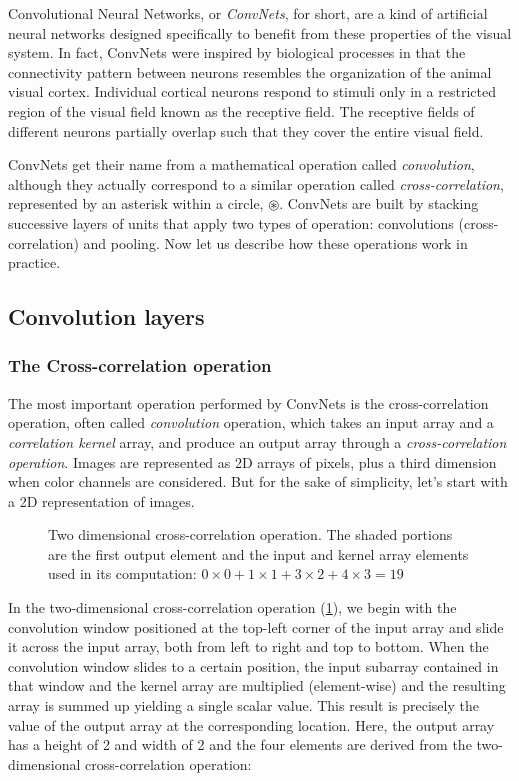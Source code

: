 Convolutional Neural Networks, or \textit{ConvNets}, for short, are a kind of artificial neural networks designed specifically to benefit from these properties of the visual system. In fact, ConvNets were inspired by biological processes in that the connectivity pattern between neurons resembles the organization of the animal visual cortex. Individual cortical neurons respond to stimuli only in a restricted region of the visual field known as the receptive field. The receptive fields of different neurons partially overlap such that they cover the entire visual field.

ConvNets get their name from a mathematical operation called \textit{convolution}, although they actually correspond to a similar operation called \textit{cross-correlation}, represented by an asterisk within a circle, $\circledast$. ConvNets are built by stacking successive layers of units that apply two types of operation: convolutions (cross-correlation) and pooling. Now let us describe how these operations work in practice.

\subsection{Convolution layers}\label{subsec:conv_layers}

\subsubsection{The Cross-correlation operation}

The most important operation performed by ConvNets is the cross-correlation operation, often called \textit{convolution} operation, which takes an input array and a \textit{correlation kernel} array, and produce an output array through a \textit{cross-correlation operation}. Images are represented as 2D arrays of pixels, plus a third dimension when color channels are considered. But for the sake of simplicity, let's start with a 2D representation of images. 

\begin{figure}[hpt]
    \centering
    
    \caption{Two dimensional cross-correlation operation. The shaded portions are the first output element and the input and kernel array elements used in its computation: $0 \times 0+1 \times 1+3 \times 2+4 \times 3=19$}
    \label{fig:correlation}
\end{figure}

In the two-dimensional cross-correlation operation (\cref{fig:correlation}), we begin with the convolution window positioned at the top-left corner of the input array and slide it across the input array, both from left to right and top to bottom. When the convolution window slides to a certain position, the input subarray contained in that window and the kernel array are multiplied (element-wise) and the resulting array is summed up yielding a single scalar value. This result is precisely the value of the output array at the corresponding location. Here, the output array has a height of 2 and width of 2 and the four elements are derived from the two-dimensional cross-correlation operation:

